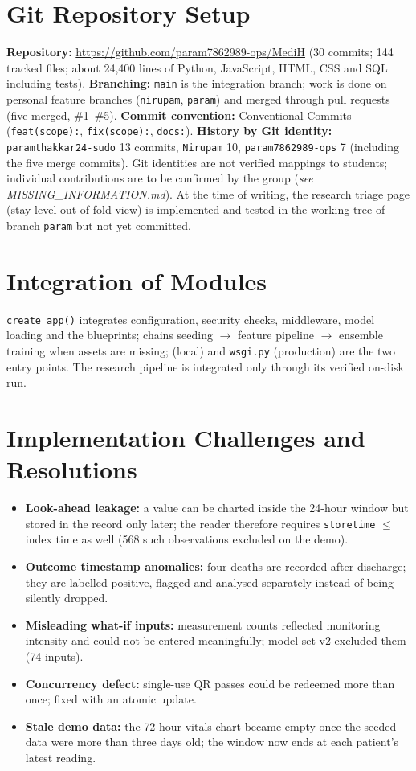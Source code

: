 \section{Git Repository Setup}
\label{sec:git}
\textbf{Repository:} \url{https://github.com/param7862989-ops/MediH} (30 commits; 144 tracked files;
about 24{,}400 lines of Python, JavaScript, HTML, CSS and SQL including tests).
\textbf{Branching:} \texttt{main} is the integration branch; work is done on personal feature branches
(\texttt{nirupam}, \texttt{param}) and merged through pull requests (five merged, \#1--\#5).
\textbf{Commit convention:} Conventional Commits (\texttt{feat(scope):}, \texttt{fix(scope):},
\texttt{docs:}). \textbf{History by Git identity:} \texttt{paramthakkar24-sudo} 13 commits,
\texttt{Nirupam} 10, \texttt{param7862989-ops} 7 (including the five merge commits). Git identities are not
verified mappings to students; individual contributions are to be confirmed by the group
(\textit{see MISSING\_INFORMATION.md}). At the time of writing, the research triage page (stay-level
out-of-fold view) is implemented and tested in the working tree of branch \texttt{param} but not yet
committed.

\section{Integration of Modules}
\texttt{create\_app()} integrates configuration, security checks, middleware, model loading and the
blueprints;  chains seeding $\rightarrow$ feature pipeline $\rightarrow$ ensemble
training when assets are missing;  (local) and \texttt{wsgi.py} (production) are the two
entry points. The research pipeline is integrated only through its verified on-disk run.

\section{Implementation Challenges and Resolutions}
\begin{itemize}
\item \textbf{Look-ahead leakage:} a value can be charted inside the 24-hour window but stored in the
      record only later; the reader therefore requires \texttt{storetime} $\le$ index time as well
      (568 such observations excluded on the demo).
\item \textbf{Outcome timestamp anomalies:} four deaths are recorded after discharge; they are labelled
      positive, flagged and analysed separately instead of being silently dropped.
\item \textbf{Misleading what-if inputs:} measurement counts reflected monitoring intensity and could not
      be entered meaningfully; model set v2 excluded them (74 inputs).
\item \textbf{Concurrency defect:} single-use QR passes could be redeemed more than once; fixed with an
      atomic update.
\item \textbf{Stale demo data:} the 72-hour vitals chart became empty once the seeded data were more than
      three days old; the window now ends at each patient's latest reading.
\end{itemize}
